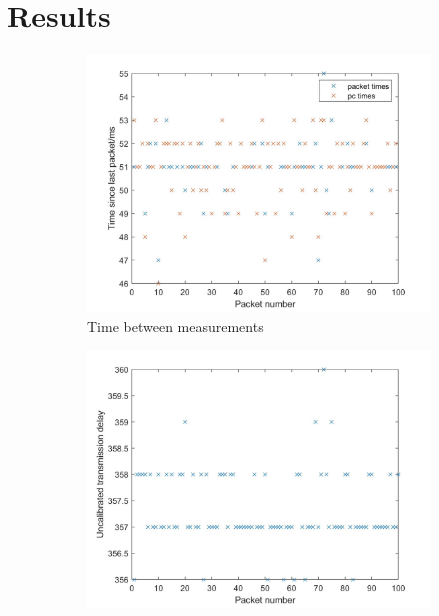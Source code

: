 \documentclass[twoside,twocolumn,12pt]{article}
\begin{document}
 

\clearpage

\clearpage
\section{Results}
\begin{figure}[hb!]
  \centering
  \begin{subfigure}[t]{0.325\textwidth}
    \includegraphics[width=\linewidth]{timestep}
   \caption{Time between measurements}
  \label{fig:ts}
  \end{subfigure}
  \begin{subfigure}[t]{0.325\textwidth}
    \includegraphics[width=\linewidth]{delay}

\end{subfigure}
\end{figure}
\end{document}
